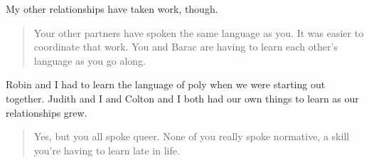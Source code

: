 My other relationships have taken work, though.

\begin{quote}
Your other partners have spoken the same language as you. It was easier to coordinate that work. You and Barac are having to learn each other's language as you go along.
\end{quote}

Robin and I had to learn the language of poly when we were starting out together. Judith and I and Colton and I both had our own things to learn as our relationships grew.

\begin{quote}
Yes, but you all spoke queer. None of you really spoke normative, a skill you're having to learn late in life.
\end{quote}
